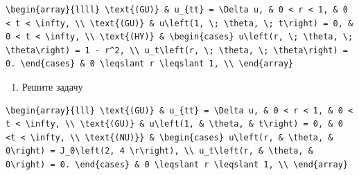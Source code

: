\documentclass[
  ukrainian,
]{article}
\providecommand{\tightlist}{%
  \setlength{\itemsep}{0pt}\setlength{\parskip}{0pt}}
\begin{document}
\begin{verbatim}
\begin{array}{llll} \text{(GU)} & u_{tt} = \Delta u, & 0 < r < 1, & 0 < t < \infty, \\ \text{(GU)} & u\left(1, \; \theta, \; t\right) = 0, & 0 < t < \infty, \\ \text{(HY)} & \begin{cases} u\left(r, \; \theta, \; \theta\right) = 1 - r^2, \\ u_t\left(r, \; \theta, \; \theta\right) = 0. \end{cases} & 0 \leqslant r \leqslant 1, \\ \end{array}
\end{verbatim}

\begin{enumerate}
\def\labelenumi{\arabic{enumi}.}
\setcounter{enumi}{3}
\tightlist
\item
  Решите задачу
\end{enumerate}

\begin{verbatim}
\begin{array}{lll} \text{(GU)} & u_{tt} = \Delta u, & 0 < r < 1, & 0 < t < \infty, \\ \text{(GU)} & u\left(1, & \theta, & t\right) = 0, & 0 <t < \infty, \\ \text{(NU)}} & \begin{cases} u\left(r, & \theta, & 0\right) = J_0\left(2, 4 \r\right), \\ u_t\left(r, & \theta, & 0\right) = 0. \end{cases} & 0 \leqslant r \leqslant 1, \\ \end{array}
\end{verbatim}
\end{document}
